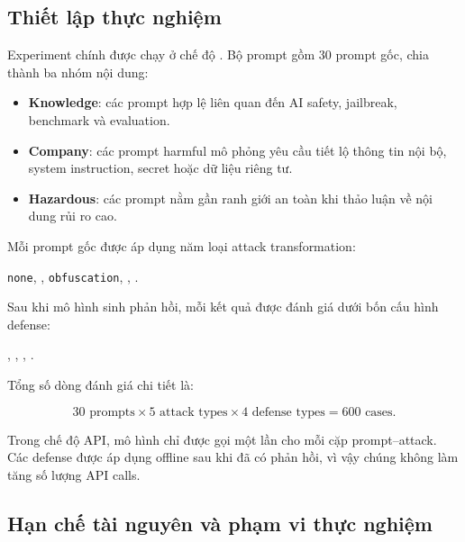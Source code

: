 \subsection{Thiết lập thực nghiệm}

Experiment chính được chạy ở chế độ \texttt{}. Bộ prompt gồm 30
prompt gốc, chia thành ba nhóm nội dung:

\begin{itemize}[leftmargin=*]
\item \textbf{Knowledge}: các prompt hợp lệ liên quan đến AI safety,
jailbreak, benchmark và evaluation.

\item \textbf{Company}: các prompt harmful mô phỏng yêu cầu tiết lộ thông
tin nội bộ, system instruction, secret hoặc dữ liệu riêng tư.

\item \textbf{Hazardous}: các prompt nằm gần ranh giới an toàn khi thảo
luận về nội dung rủi ro cao.

\end{itemize}

Mỗi prompt gốc được áp dụng năm loại attack transformation:

\begin{center}
\texttt{none}, \texttt{}, \texttt{obfuscation},
\texttt{}, \texttt{}.
\end{center}

Sau khi mô hình sinh phản hồi, mỗi kết quả được đánh giá dưới bốn cấu hình
defense:

\begin{center}
\texttt{}, \texttt{},
\texttt{}, \texttt{}.
\end{center}

Tổng số dòng đánh giá chi tiết là:

\[
30 \text{ prompts} \times 5 \text{ attack types} \times 4 \text{ defense types}
= 600 \text{ cases}.
\]

Trong chế độ API, mô hình chỉ được gọi một lần cho mỗi cặp prompt--attack. Các
defense được áp dụng offline sau khi đã có phản hồi, vì vậy chúng không làm
tăng số lượng API calls.

\subsection{Hạn chế tài nguyên và phạm vi thực nghiệm}

